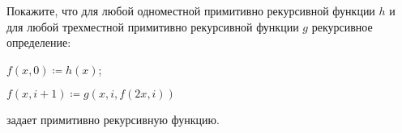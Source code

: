 Покажите, что для любой одноместной примитивно рекурсивной функции $h$ и для любой трехместной примитивно
рекурсивной функции $g$ рекурсивное определение:
\begin{itemtask}
    \item $f(x, 0) \coloneqq h(x)$;
    \item $f(x, i + 1) \coloneqq g(x, i, f(2 x, i))$
\end{itemtask}
задает примитивно рекурсивную функцию.